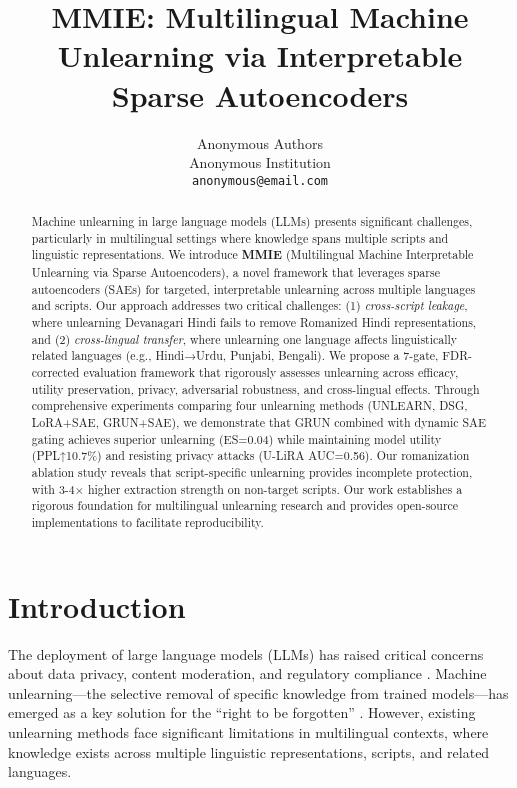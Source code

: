\documentclass[11pt]{article}
\title{MMIE: Multilingual Machine Unlearning via Interpretable Sparse Autoencoders}
\author{
  Anonymous Authors \\
  Anonymous Institution \\
  \texttt{anonymous@email.com}
}
\begin{document}
\maketitle

\begin{abstract}
Machine unlearning in large language models (LLMs) presents significant challenges, particularly in multilingual settings where knowledge spans multiple scripts and linguistic representations. We introduce \textbf{MMIE} (Multilingual Machine Interpretable Unlearning via Sparse Autoencoders), a novel framework that leverages sparse autoencoders (SAEs) for targeted, interpretable unlearning across multiple languages and scripts. Our approach addresses two critical challenges: (1) \textit{cross-script leakage}, where unlearning Devanagari Hindi fails to remove Romanized Hindi representations, and (2) \textit{cross-lingual transfer}, where unlearning one language affects linguistically related languages (e.g., Hindi→Urdu, Punjabi, Bengali). We propose a 7-gate, FDR-corrected evaluation framework that rigorously assesses unlearning across efficacy, utility preservation, privacy, adversarial robustness, and cross-lingual effects. Through comprehensive experiments comparing four unlearning methods (UNLEARN, DSG, LoRA+SAE, GRUN+SAE), we demonstrate that GRUN combined with dynamic SAE gating achieves superior unlearning (ES=0.04) while maintaining model utility (PPL↑10.7\%) and resisting privacy attacks (U-LiRA AUC=0.56). Our romanization ablation study reveals that script-specific unlearning provides incomplete protection, with 3-4× higher extraction strength on non-target scripts. Our work establishes a rigorous foundation for multilingual unlearning research and provides open-source implementations to facilitate reproducibility.
\end{abstract}

\section{Introduction}

The deployment of large language models (LLMs) has raised critical concerns about data privacy, content moderation, and regulatory compliance \cite{gdpr2018,ccpa2020}. Machine unlearning—the selective removal of specific knowledge from trained models—has emerged as a key solution for the ``right to be forgotten'' \cite{cao2015towards,bourtoule2021machine}. However, existing unlearning methods face significant limitations in multilingual contexts, where knowledge exists across multiple linguistic representations, scripts, and related languages.
\end{document}
